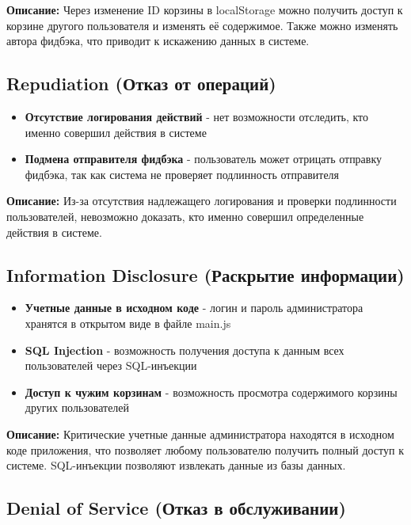 \documentclass{article}
\begin{document}
\textbf{Описание:} Через изменение ID корзины в localStorage можно получить доступ к корзине другого пользователя и изменять её содержимое. Также можно изменять автора фидбэка, что приводит к искажению данных в системе.

\subsection{Repudiation (Отказ от операций)}

\begin{itemize}
    \item \textbf{Отсутствие логирования действий} - нет возможности отследить, кто именно совершил действия в системе
    \item \textbf{Подмена отправителя фидбэка} - пользователь может отрицать отправку фидбэка, так как система не проверяет подлинность отправителя
\end{itemize}

\textbf{Описание:} Из-за отсутствия надлежащего логирования и проверки подлинности пользователей, невозможно доказать, кто именно совершил определенные действия в системе.

\subsection{Information Disclosure (Раскрытие информации)}

\begin{itemize}
    \item \textbf{Учетные данные в исходном коде} - логин и пароль администратора хранятся в открытом виде в файле main.js
    \item \textbf{SQL Injection} - возможность получения доступа к данным всех пользователей через SQL-инъекции
    \item \textbf{Доступ к чужим корзинам} - возможность просмотра содержимого корзины других пользователей
\end{itemize}

\textbf{Описание:} Критические учетные данные администратора находятся в исходном коде приложения, что позволяет любому пользователю получить полный доступ к системе. SQL-инъекции позволяют извлекать данные из базы данных.

\subsection{Denial of Service (Отказ в обслуживании)}
\end{document}
